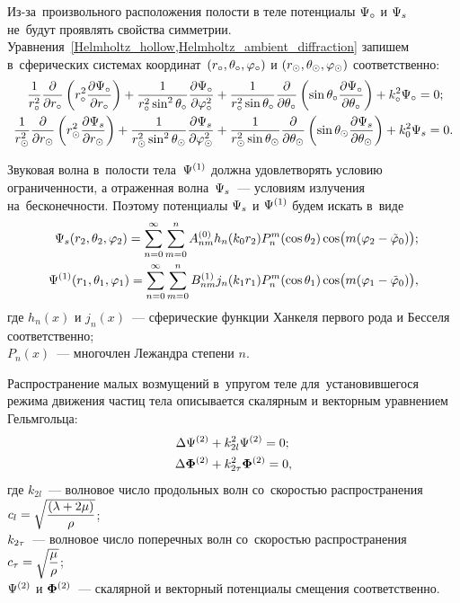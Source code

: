 Из-за~произвольного расположения полости в теле потенциалы $\P_\c$ и $\P_s$ не~будут проявлять свойства симметрии.
Уравнения~\cref{Helmholtz_hollow,Helmholtz_ambient_diffraction} запишем в~сферических системах координат~$(r_\c, \Q_\c, \f_\c)$ и $(r_\s, \Q_\s, \f_\s)$ соответственно:
\begin{align}
\fr1{r_\c^2}\fr\de{\de r_\c}\left(r_\c^2 \fr{\de\P_\c}{\de r_\c}\right) + \fr1{r_\c^2\sin^2\Q_\c}\fr{\de\P_\c}{\de\f_\c^2} &+ \fr1{r_\c^2\sin\Q_\c}\fr\de{\de\Q_\c} \left(\sin\Q_\c \fr{\de\P_\c}{\de\Q_\c}\right) + k_\c^2\P_\c = 0;\\
\fr1{r_\s^2}\fr\de{\de r_\s}\left(r_\s^2 \fr{\de\P_s}{\de r_\s}\right) + \fr1{r_\s^2\sin^2\Q_\s}\fr{\de\P_s}{\de\f_\s^2} &+ \fr1{r_\s^2\sin\Q_\s}\fr\de{\de\Q_\s} \left(\sin\Q_\s \fr{\de\P_s}{\de\Q_\s}\right) + k_0^2\P_s = 0.
\end{align}

Звуковая волна в~полости тела~$\P^{(1)}$ должна удовлетворять условию ограниченности, а отраженная волна~$\P_s$~--- условиям излучения на~бесконечности. Поэтому потенциалы $\P_s$ и $\P^{(1)}$ будем искать в~виде 
\begin{align}\P_s(r_2, \Q_2, \f_2) = \sum\limits_{n = 0}^\infty \sum\limits_{m = 0}^n A_{nm}^{(0)} h_n(k_0 r_2) P_n^m(\cos\Q_2)\cos\bigl(m(\f_2-\ft_0)\bigr);\\
\P^{(1)}(r_1, \Q_1, \f_1) = \sum\limits_{n = 0}^\infty \sum\limits_{m = 0}^n B_{nm}^{(1)} j_n(k_1 r_1) P_n^m(\cos\Q_1)\cos\bigl(m(\f_1-\ft_0)\bigr),
\end{align}
где $h_n(x)$ и $j_n(x)$~--- сферические функции Ханкеля первого рода и Бесселя соответственно; \\
$P_n(x)$~--- многочлен Лежандра степени $n$.





Распространение малых возмущений в~упругом теле для~установившегося режима движения частиц тела описывается скалярным и векторным уравнением Гельмгольца:
\begin{align}
\Lap\P^{(2)} &+ k_{2l}^2\P^{(2)} = 0;\label{Helmholtz_scalar}\\
\Lap\F^{(2)} &+ k_{2\t}^2\F^{(2)} = 0,\label{Helmholtz_vector}
\end{align}
где $k_{2l}$~--- волновое число продольных волн со~скоростью распространения \break 
$c_l = \sqrt{\df{(\la + 2\mu)}\r}$;\\
$k_{2\t}$~--- волновое число поперечных волн со~скоростью распространения
$c_\t = \sqrt{\df\mu\r}$;\\
$\P^{(2)}$ и $\F^{(2)}$~--- скалярной и векторный потенциалы смещения соответственно.

